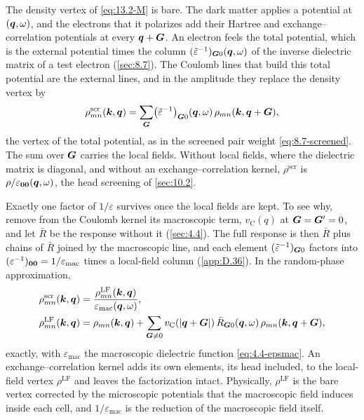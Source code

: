 The density vertex of \cref{eq:13.2-M} is bare. The dark matter applies a potential at $(\bm{q},\omega)$, and the electrons that it polarizes add their Hartree and exchange--correlation potentials at every $\bm{q} + \bm{G}$. An electron feels the total potential, which is the external potential times the column $(\tilde\varepsilon^{-1})_{\bm{G}0}(\bm{q},\omega)$ of the inverse dielectric matrix of a test electron (\cref{sec:8.7}). The Coulomb lines that build this total potential are the external lines, and in the amplitude they replace the density vertex by
\begin{equation}
  \rho^{\mathrm{scr}}_{mn}(\bm{k},\bm{q}) = \sum_{\bm{G}}\bigl(\tilde\varepsilon^{-1}\bigr)_{\bm{G}0}(\bm{q},\omega)\,\rho_{mn}(\bm{k},\bm{q}+\bm{G}) ,
  \label{eq:13.4-rhoscr}
\end{equation}
the vertex of the total potential, as in the screened pair weight \cref{eq:8.7-screened}. The sum over $\bm{G}$ carries the local fields. Without local fields, where the dielectric matrix is diagonal, and without an exchange--correlation kernel, $\rho^{\mathrm{scr}}$ is $\rho/\varepsilon_{\bm{0}\bm{0}}(\bm{q},\omega)$, the head screening of \cref{sec:10.2}.

Exactly one factor of $1/\varepsilon$ survives once the local fields are kept. To see why, remove from the Coulomb kernel its macroscopic term, $v_{\mathrm{C}}(q)$ at $\bm{G} = \bm{G}' = 0$, and let $\bar R$ be the response without it (\cref{sec:4.4}). The full response is then $\bar R$ plus chains of $\bar R$ joined by the macroscopic line, and each element $(\tilde\varepsilon^{-1})_{\bm{G}0}$ factors into $(\varepsilon^{-1})_{\bm{0}\bm{0}} = 1/\varepsilon_{\mathrm{mac}}$ times a local-field column (\cref{app:D.36}). In the random-phase approximation,
\begin{equation}
  \begin{aligned}
  \rho^{\mathrm{scr}}_{mn}(\bm{k},\bm{q}) &= \frac{\rho^{\mathrm{LF}}_{mn}(\bm{k},\bm{q})}{\varepsilon_{\mathrm{mac}}(\bm{q},\omega)} , \\
  \rho^{\mathrm{LF}}_{mn}(\bm{k},\bm{q}) &= \rho_{mn}(\bm{k},\bm{q}) + \sum_{\bm{G}\ne0}v_{\mathrm{C}}(|\bm{q}+\bm{G}|)\,\bar R_{\bm{G}0}(\bm{q},\omega)\,\rho_{mn}(\bm{k},\bm{q}+\bm{G}) ,
  \end{aligned}
  \label{eq:13.4-rhoLF}
\end{equation}
exactly, with $\varepsilon_{\mathrm{mac}}$ the macroscopic dielectric function \cref{eq:4.4-epsmac}. An exchange--correlation kernel adds its own elements, its head included, to the local-field vertex $\rho^{\mathrm{LF}}$ and leaves the factorization intact. Physically, $\rho^{\mathrm{LF}}$ is the bare vertex corrected by the microscopic potentials that the macroscopic field induces inside each cell, and $1/\varepsilon_{\mathrm{mac}}$ is the reduction of the macroscopic field itself.

